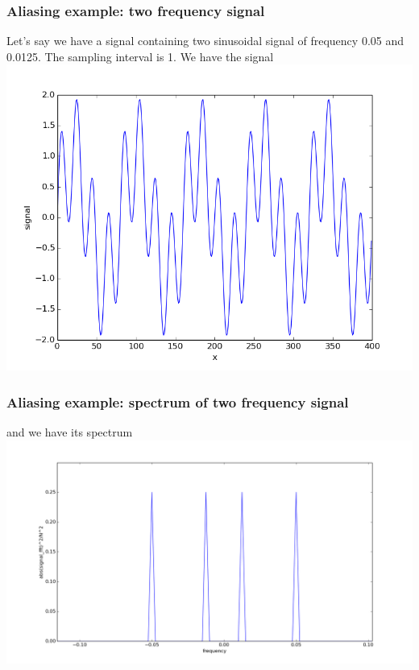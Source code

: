 \documentclass{beamer}
\begin{document}
\begin{frame}
\frametitle{Aliasing example: two frequency signal}
Let's say we have a signal containing two sinusoidal signal of frequency 0.05 and 0.0125. The sampling interval is 1. We have the signal \\
\includegraphics[scale=0.4]{two_f_signal.png}
\end{frame}
\begin{frame}
\frametitle{Aliasing example: spectrum of two frequency signal}
and we have its spectrum
\includegraphics[scale=0.3]{two_f_dft.png}
\end{frame}
\end{document}

